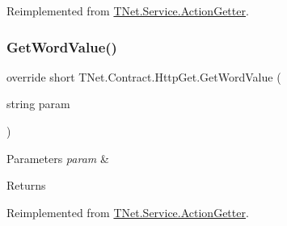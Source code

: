 Reimplemented from \mbox{\hyperlink{class_t_net_1_1_service_1_1_action_getter_a5ef686fe56be0128c3232df533d88580}{T\+Net.\+Service.\+Action\+Getter}}.

\mbox{\label{class_t_net_1_1_contract_1_1_http_get_a36c1698d3ab3e6dcf49dd46d7d3b3478}} 
\subsubsection{\texorpdfstring{Get\+Word\+Value()}{GetWordValue()}\hspace{0.1cm}{\footnotesize\ttfamily [1/2]}}
{\footnotesize\ttfamily override short T\+Net.\+Contract.\+Http\+Get.\+Get\+Word\+Value (\begin{DoxyParamCaption}\item[{string}]{param }\end{DoxyParamCaption})\hspace{0.3cm}{\ttfamily [virtual]}}






\begin{DoxyParams}{Parameters}
{\em param} & \\
\hline
\end{DoxyParams}
\begin{DoxyReturn}{Returns}

\end{DoxyReturn}


Reimplemented from \mbox{\hyperlink{class_t_net_1_1_service_1_1_action_getter_a8be520b300536485ba4108a52b2c9310}{T\+Net.\+Service.\+Action\+Getter}}.

\mbox{\label{class_t_net_1_1_contract_1_1_http_get_a2ee823780a1ca44bcf516a8b1d380e59}} 
